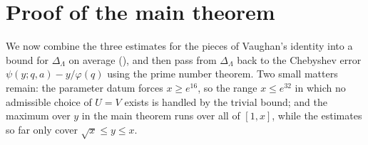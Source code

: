 \chapter{Proof of the main theorem}\label{ch:assembly}

We now combine the three estimates for the pieces of Vaughan's identity into a bound for
$\Delta_\Lambda$ on average (), and then pass from $\Delta_\Lambda$ back to the
Chebyshev error $\psi(y; q, a) - y/\varphi(q)$ using the prime number theorem. Two small matters remain:
the parameter datum forces $x \ge e^{16}$, so the range $x \le e^{32}$ in which no admissible choice of
$U = V$ exists is handled by the trivial bound; and the maximum over $y$ in the main theorem runs
over all of $[1, x]$, while the estimates so far only cover $\sqrt x \le y \le x$.






